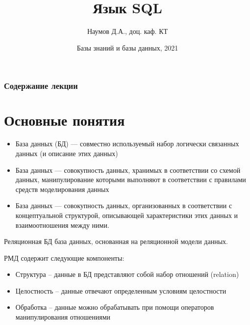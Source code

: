 \documentclass{beamer}
\title[СУБД]{Язык SQL}
\author{Наумов Д.А., доц. каф. КТ}
\date[10.03.2021] {Базы знаний и базы данных, 2021}
\begin{document}
\begin{frame}
  \titlepage
\end{frame}
  
\begin{frame}
  \frametitle{Содержание лекции}
  \tableofcontents  
\end{frame}
  
\section{Основные понятия}
\begin{frame}
	\begin{itemize}
		\item База данных (БД) — совместно используемый набор логически связанных данных (и описание этих данных)
		\item База данных — совокупность данных, хранимых в соответствии со схемой данных, манипулирование которыми выполняют в соответствии с правилами средств моделирования данных 
		\item База данных — совокупность данных, организованных в соответствии с концептуальной структурой, описывающей характеристики этих данных и взаимоотношения между ними.
	\end{itemize}
\end{frame} 

\begin{frame}
	\begin{block}{Реляционная БД}
		база данных, основанная на реляционной модели данных.
	\end{block}
	РМД содержит следующие компоненты:
	\begin{itemize}
		\item Структура – данные в БД представляют собой набор отношений (relation) 
		\item Целостность – данные отвечают определенным условиям целостности
		\item Обработка – данные можно обрабатывать при помощи операторов манипулирования отношениями
	\end{itemize}
\end{frame} 
\end{document}
